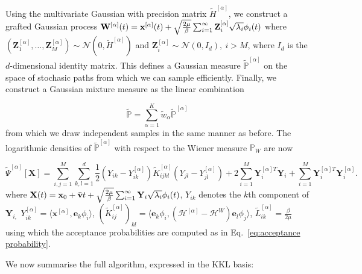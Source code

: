 Using the multivariate Gaussian with precision matrix $\tilde{H}^{[\alpha]}$,
we construct a grafted Gaussian process ${\bf W}^{[\alpha]}(t)=\mathbf{x}^{[\alpha]}(t)+\sqrt{\frac{2\mu}{\beta}}\sum_{i=1}^{\infty}\mathbf{Z}_{i}^{[\alpha]}\sqrt{\lambda_{i}}\phi_{i}(t)$
where $(\mathbf{Z}_{1}^{[\alpha]},\dots,\mathbf{Z}_{M}^{[\alpha]})\sim\mathcal{N}(0,\tilde{H}^{[\alpha]})$
and $\mathbf{Z}_{i}^{[\alpha]}\sim\mathcal{N}(0,I_{d}),\ i>M$, where
$I_{d}$ is the $d$-dimensional identity matrix. This defines a Gaussian
measure $\mathbb{\tilde{P}}^{[\alpha]}$ on the space of stochasic
paths from which we can sample efficiently. Finally, we construct
a Gaussian mixture measure as the linear combination

\begin{equation}
\tilde{\mathbb{P}}=\sum_{\alpha=1}^{K}\tilde{w}_{\alpha}\mathbb{\tilde{P}}^{[\alpha]}\label{eq:mixed gaussian-1-1}
\end{equation}
from which we draw independent samples in the same manner as before.
The logarithmic densities of $\mathbb{\tilde{P}}^{[\alpha]}$ with
respect to the Wiener measure $\mathbb{P}_{W}$ are now

\begin{equation}
\tilde{\Psi}^{[\alpha]}[\mathbf{X}]=\sum_{i,j=1}^{M}\sum_{k,l=1}^{d}\frac{1}{2}(Y_{ik}-Y_{ik}^{[\alpha]})\tilde{K}_{ijkl}^{[\alpha]}(Y_{jl}-Y_{jl}^{[\alpha]})+2\sum_{i=1}^{M}\mathbf{Y}_{i}^{[\alpha]T}\mathbf{Y}_{i}+\sum_{i=1}^{M}\mathbf{Y}_{i}^{[\alpha]T}\mathbf{Y}_{i}^{[\alpha]}.
\end{equation}
where ${\bf X}(t)=\mathbf{x}_{0}+\bar{\mathbf{v}}t+\sqrt{\frac{2\mu}{\beta}}\sum_{i=1}^{\infty}\mathbf{Y}_{i}\sqrt{\lambda_{i}}\phi_{i}(t)$,
$Y_{ik}$ denotes the $k$th component of $\mathbf{Y}_{i,}$ $Y_{ik}^{[\alpha]}=\langle\mathbf{x}^{[\alpha]},\mathbf{e}_{k}\phi_{i}\rangle$,
$\left(\tilde{K}_{ij}^{[\alpha]}\right)_{kl}=\langle\mathbf{e}_{k}\phi_{i},(\mathcal{H}^{[\alpha]}-\mathcal{H}^{W})\mathbf{e}_{l}\phi_{j}\rangle$,
$\tilde{L}_{ik}^{[\alpha]}=\frac{\beta}{2\mu}$ using which the acceptance
probabilities are computed as in Eq.~\eqref{eq:acceptance probability}.

We now summarise the full algorithm, expressed in the KKL basis:

